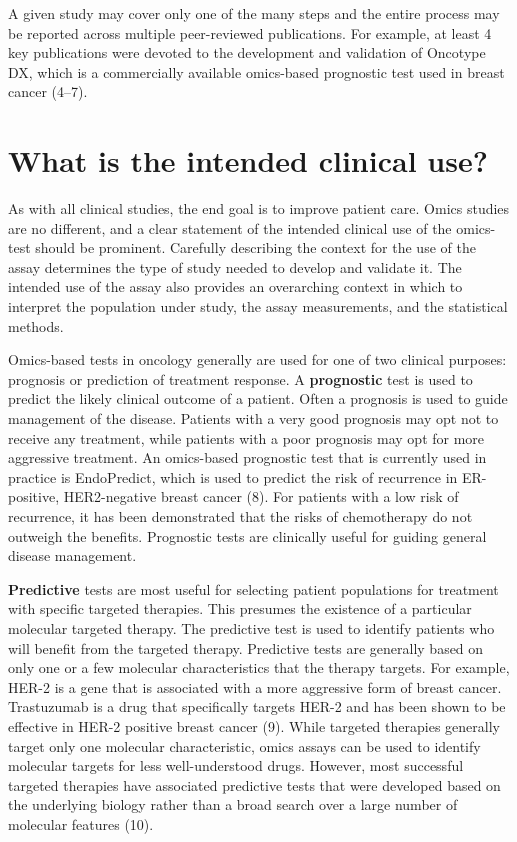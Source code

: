 \documentclass[11pt]{article}
\begin{document}
A given study may cover only one of the many steps and the entire
process may be reported across multiple peer-reviewed publications. For
example, at least 4 key publications were devoted to the development and
validation of Oncotype DX, which is a commercially available omics-based
prognostic test used in breast cancer (4--7).

\section{What is the intended clinical
use?}\label{what-is-the-intended-clinical-use}

As with all clinical studies, the end goal is to improve patient care.
Omics studies are no different, and a clear statement of the intended
clinical use of the omics-test should be prominent. Carefully describing
the context for the use of the assay determines the type of study needed
to develop and validate it. The intended use of the assay also provides
an overarching context in which to interpret the population under study,
the assay measurements, and the statistical methods.

Omics-based tests in oncology generally are used for one of two clinical
purposes: prognosis or prediction of treatment response. A
\textbf{prognostic} test is used to predict the likely clinical outcome
of a patient. Often a prognosis is used to guide management of the
disease. Patients with a very good prognosis may opt not to receive any
treatment, while patients with a poor prognosis may opt for more
aggressive treatment. An omics-based prognostic test that is currently
used in practice is EndoPredict, which is used to predict the risk of
recurrence in ER-positive, HER2-negative breast cancer (8). For patients
with a low risk of recurrence, it has been demonstrated that the risks
of chemotherapy do not outweigh the benefits. Prognostic tests are
clinically useful for guiding general disease management.

\textbf{Predictive} tests are most useful for selecting patient
populations for treatment with specific targeted therapies. This
presumes the existence of a particular molecular targeted therapy. The
predictive test is used to identify patients who will benefit from the
targeted therapy. Predictive tests are generally based on only one or a
few molecular characteristics that the therapy targets. For example,
HER-2 is a gene that is associated with a more aggressive form of breast
cancer. Trastuzumab is a drug that specifically targets HER-2 and has
been shown to be effective in HER-2 positive breast cancer (9). While
targeted therapies generally target only one molecular characteristic,
omics assays can be used to identify molecular targets for less
well-understood drugs. However, most successful targeted therapies have
associated predictive tests that were developed based on the underlying
biology rather than a broad search over a large number of molecular
features (10).
\end{document}
